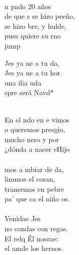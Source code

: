 \begin{cancion}%
	  \\
	n pado 20 años\\
	de que s se hizo peeño,\\
	se hizo bre, y hulde,\\
	pues  quiere su rno\\jump\\
	\begin{chorus}%
	Jes ya ne a tu da,\\
	Jes ya ne a tu hor.\\
	una ilia uda \\
	spre será Navd*  \\
	\end{chorus}%
	\jump\\
	En el ndo en e vimos\\
	o queremos presgio,\\
	mucho nero y por\\
	¿dónda a nacer eHijo\\
	\jump\\
	mos a mbiar de da,\\
	limmos el coran, \\
	transrmos en pebre \\
	pa' que ca el niño os.\\
	\jump\\
	 Venidae Jes \\
	no condas con regas.\\
	El relq Él nosrae:\\
	el amde los hernos. \\
\end{cancion}%

